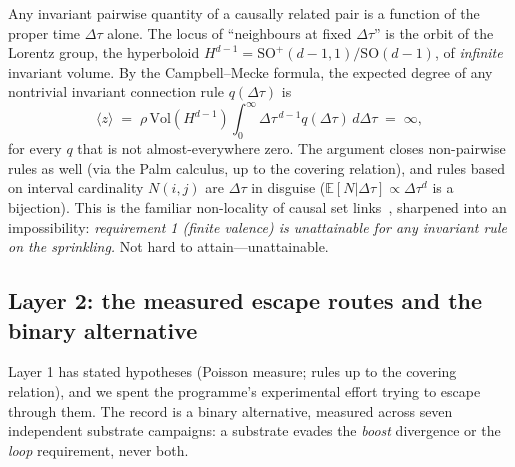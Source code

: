 \documentclass[aps,prd,reprint,nofootinbib,superscriptaddress,floatfix]{revtex4-2}
\begin{document}
Any invariant pairwise quantity of a causally related pair is a function of the proper
time $\Delta\tau$ alone. The locus of ``neighbours at fixed $\Delta\tau$'' is the orbit
of the Lorentz group, the hyperboloid $H^{d-1}\!=\mathrm{SO}^+(d\!-\!1,1)/\mathrm{SO}(d\!-\!1)$,
of \emph{infinite} invariant volume. By the Campbell--Mecke formula, the expected degree
of any nontrivial invariant connection rule $q(\Delta\tau)$ is
\begin{equation}
\langle z\rangle \;=\; \rho\,\mathrm{Vol}(H^{d-1})\!\int_0^\infty\! \Delta\tau^{\,d-1}
q(\Delta\tau)\,d\Delta\tau \;=\; \infty ,
\label{eq:layer1}
\end{equation}
for every $q$ that is not almost-everywhere zero. The argument closes non-pairwise rules
as well (via the Palm calculus, up to the covering relation), and rules based on interval
cardinality $N(i,j)$ are $\Delta\tau$ in disguise
($\mathbb{E}[N|\Delta\tau]\propto\Delta\tau^d$ is a bijection). This is the familiar
non-locality of causal set links~\cite{Surya2019}, sharpened into an impossibility:
\emph{requirement 1 (finite valence) is unattainable for any invariant rule on the
sprinkling.} Not hard to attain---unattainable.

\subsection{Layer 2: the measured escape routes and the binary alternative}

Layer 1 has stated hypotheses (Poisson measure; rules up to the covering relation), and
we spent the programme's experimental effort trying to escape through them. The record
is a binary alternative, measured across seven independent substrate campaigns: a
substrate evades the \emph{boost} divergence or the \emph{loop} requirement, never both.
\end{document}
